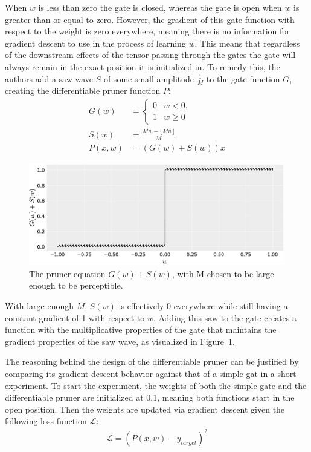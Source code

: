 When $w$ is less than zero the gate is closed, whereas the gate is open when $w$ is greater than or equal to zero.
However, the gradient of this gate function with respect to the weight is zero everywhere, meaning there is no
information for gradient descent to use in the process of learning $w$. This means that regardless of the downstream
effects of the tensor passing through the gates the gate will always remain in the exact position it is initialized in.
To remedy this, the authors add a saw wave $S$ of some small amplitude $\frac{1}{M}$ to the gate function $G$,
creating the differentiable pruner function $P$:
\begin{align}
	G(w) &= \begin{cases}
						0 & w<0, \\
						1 & w\ge 0
					\end{cases} \label{eq:gate} \\
	S(w) &= \frac{M w - \lfloor M w \rfloor}{M} \label{eq:saw}\\
	P(x, w) &= (G(w) + S(w)) x
\end{align}

\begin{figure}[ht!]
	\centering
	\includegraphics[height=12em]{pruner}
	\caption[The differentiable pruner function, plotted]{The pruner equation $G(w)+S(w)$, with M chosen to be large enough to be perceptible.}
	\label{fig:pruner}
\end{figure}


With large enough $M$, $S(w)$ is effectively 0 everywhere while still having
a constant gradient of 1 with respect to $w$. Adding this saw to the gate creates a function with the
multiplicative properties of the gate that maintains the gradient properties of the saw wave, as visualized in
Figure~\ref{fig:pruner}.


The reasoning behind the design of the differentiable pruner can be justified by comparing its gradient descent behavior
against that of a simple gat in a short experiment. To start the experiment, the weights of both the simple gate and the differentiable pruner are initialized at
0.1, meaning both functions start in the open position. Then the weights are updated via gradient descent given the following
loss function $\mathcal{L}$:
\begin{align}
	\mathcal{L} = (P(x, w) - y_{target})^2
\end{align}

